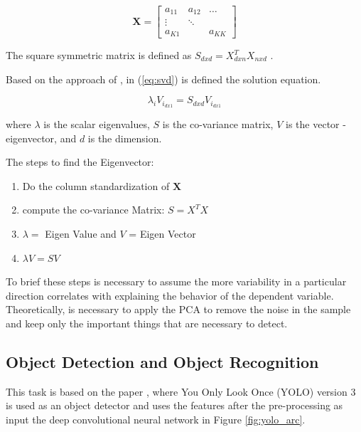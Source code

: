 \begin{equation}\label{eq:matrix}
    \mathbf{X} = \begin{bmatrix} 
    a_{11} & a_{12} & \dots \\
    \vdots & \ddots & \\
    a_{K1} &        & a_{KK} 
    \end{bmatrix}
\end{equation}

The square symmetric matrix is defined as $S_{dxd} = X^T_{dxn}X_{nxd}$ \cite{Halko_2011}. 

Based on the approach of \cite{cambridge2009introduction}, in (\ref{eq:svd}) is defined the solution equation.

\begin{equation}
    \label{eq:svd}
    \lambda_i V_{i_{dx1}} = S_{dxd}V_{i_{dx1}}
\end{equation}

where $\lambda$ is the scalar eigenvalues, $S$ is the co-variance matrix, $V$ is the vector - eigenvector, and $d$ is the dimension.

The steps to find the Eigenvector: 

\begin{enumerate}
    \item Do the column standardization of $\mathbf{X}$
    \item compute the co-variance Matrix: $S = X^TX$
    \item $\lambda = $ Eigen Value and $V$ = Eigen Vector
    \item $\lambda V = SV$
\end{enumerate}

To brief these steps is necessary to assume the more variability in a particular direction correlates with explaining the behavior of the dependent variable. Theoretically, is necessary to apply the PCA to remove the noise in the sample and keep only the important things that are necessary to detect.


\subsection{Object Detection and Object Recognition} 

This task is based on the paper \cite{redmon2016you}, where You Only Look Once (YOLO) version 3 is used as an object detector and uses the features after the pre-processing as input the deep convolutional neural network in Figure \ref{fig:yolo_arc}.  

